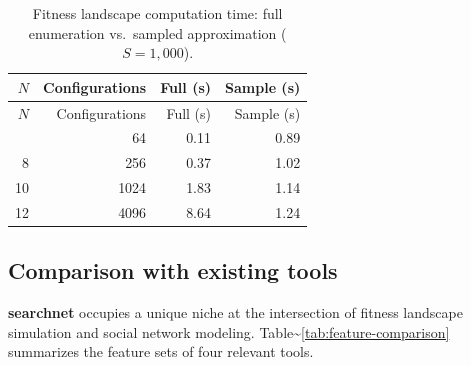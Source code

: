 \documentclass[
]{article}
\newenvironment{Shaded}{\begin{snugshade}}{\end{snugshade}}
\newcommand{\AttributeTok}[1]{\textcolor[rgb]{0.13,0.29,0.53}{#1}}
\newcommand{\DecValTok}[1]{\textcolor[rgb]{0.00,0.00,0.81}{#1}}
\newcommand{\DocumentationTok}[1]{\textcolor[rgb]{0.56,0.35,0.01}{\textbf{\textit{#1}}}}
\newcommand{\FunctionTok}[1]{\textcolor[rgb]{0.13,0.29,0.53}{\textbf{#1}}}
\newcommand{\NormalTok}[1]{#1}
\newcommand{\OtherTok}[1]{\textcolor[rgb]{0.56,0.35,0.01}{#1}}
\newcommand{\SpecialCharTok}[1]{\textcolor[rgb]{0.81,0.36,0.00}{\textbf{#1}}}
\newcommand{\StringTok}[1]{\textcolor[rgb]{0.31,0.60,0.02}{#1}}
\begin{document}
\begin{Shaded}
\end{Shaded}

\begin{longtable}[]{@{}rrrr@{}}
\caption{Fitness landscape computation time: full enumeration
vs.~sampled approximation (\(S = 1{,}000\)).}\tabularnewline
\toprule\noalign{}
\(N\) & Configurations & Full (s) & Sample (s) \\
\midrule\noalign{}
\endfirsthead
\toprule\noalign{}
\(N\) & Configurations & Full (s) & Sample (s) \\
\midrule\noalign{}
\endhead
\bottomrule\noalign{}
\endlastfoot
6 & 64 & 0.11 & 0.89 \\
8 & 256 & 0.37 & 1.02 \\
10 & 1024 & 1.83 & 1.14 \\
12 & 4096 & 8.64 & 1.24 \\
\end{longtable}

\subsection{Comparison with existing tools}\label{sec:comparison}

\textbf{searchnet} occupies a unique niche at the intersection of
fitness landscape simulation and social network modeling.
Table\textasciitilde{}\ref{tab:feature-comparison} summarizes the
feature sets of four relevant tools.
\end{document}
